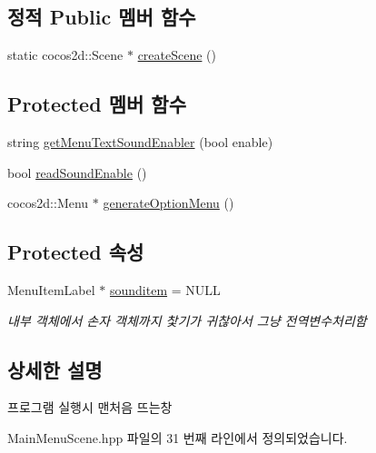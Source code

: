 \subsection*{정적 Public 멤버 함수}
\begin{DoxyCompactItemize}
\item 
static cocos2d\+::\+Scene $\ast$ \hyperlink{class_tetris_1_1_cocos2d_scenes_1_1_main_menu_scene_a46eb7e1d9999c6ed8e9acf49cfcd21cf}{create\+Scene} ()
\end{DoxyCompactItemize}
\subsection*{Protected 멤버 함수}
\begin{DoxyCompactItemize}
\item 
string \hyperlink{class_tetris_1_1_cocos2d_scenes_1_1_main_menu_scene_a0c0e61e744b15a2e2c55ad37be625c2f}{get\+Menu\+Text\+Sound\+Enabler} (bool enable)
\item 
bool \hyperlink{class_tetris_1_1_cocos2d_scenes_1_1_main_menu_scene_a0454c0398dc84b0c8f9e1b3ff72da69d}{read\+Sound\+Enable} ()
\item 
cocos2d\+::\+Menu $\ast$ \hyperlink{class_tetris_1_1_cocos2d_scenes_1_1_main_menu_scene_a1d29d6f4c75637e30b6a7621b3c74ac7}{generate\+Option\+Menu} ()
\end{DoxyCompactItemize}
\subsection*{Protected 속성}
\begin{DoxyCompactItemize}
\item 
Menu\+Item\+Label $\ast$ \hyperlink{class_tetris_1_1_cocos2d_scenes_1_1_main_menu_scene_a39d5adca64f40a97548344531ff019b8}{sounditem} = N\+U\+LL
\begin{DoxyCompactList}\small\item\em 내부 객체에서 손자 객체까지 찿기가 귀찮아서 그냥 전역변수처리함 \end{DoxyCompactList}\end{DoxyCompactItemize}


\subsection{상세한 설명}
프로그램 실행시 맨처음 뜨는창 

Main\+Menu\+Scene.\+hpp 파일의 31 번째 라인에서 정의되었습니다.



